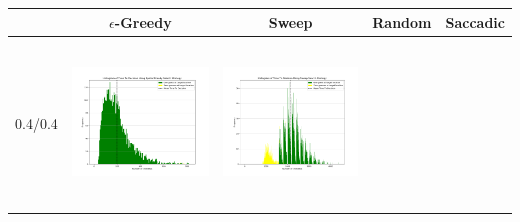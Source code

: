 \begin{landscape}
\begin{table}[h!]
  \centering
  \begin{tabular}{ | c | c | c | c | c |}
    \hline
    & $\epsilon$-Greedy & Sweep & Random & Saccadic \\
    \hline
    0.4/0.4 & \vline
    \begin{minipage}[c][45mm][c]{45mm}
      \includegraphics[width=44mm, height=44mm]{Chapters/MultiAgentTargetDetection/Figs/Histograms/MiscalibratedSensor/4-4/4-4EpsilonGreedyHistogram.png}
    \end{minipage}
    &
    \begin{minipage}[c][45mm][c]{45mm}
      \includegraphics[width=44mm, height=44mm]{Chapters/MultiAgentTargetDetection/Figs/Histograms/MiscalibratedSensor/4-4/4-4SweepHistogram.png}


\end{minipage}
\end{tabular}
\end{table}
\end{landscape}
